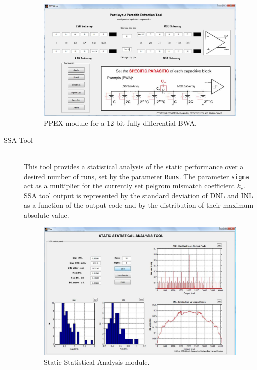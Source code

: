 \begin{description}
\begin{figure}[h!]
	\centering
	\includegraphics[scale=0.35]{pics/ppex.jpg}
	\caption{PPEX module for a 12-bit fully differential BWA.}
	\label{fig:ppex}
\end{figure}

	\item[SSA Tool] \hfill \\
	This tool provides a statistical analysis of the static performance over a desired number of runs, set by the parameter \texttt{Runs}. The parameter \texttt{sigma} act as a multiplier for the currently set pelgrom mismatch coefficient $k_{c}$. SSA tool output is represented by the standard deviation of DNL and INL as a function of the output code and by the distribution of their maximum absolute value.
\begin{figure}[h!]
	\centering
	\includegraphics[scale=0.35]{pics/ssa.jpg}
	\caption{Static Statistical Analysis module.}
	\label{fig:ppex}
\end{figure}


\end{description}
